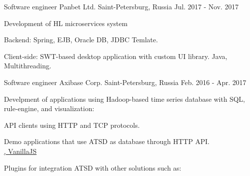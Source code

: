 

\begin{cventries}

  \cventry
  {Software engineer} %
  {Panbet Ltd.} %
  {Saint-Petersburg, Russia} %
  {Jul. 2017 - Nov. 2017} %
  {
  \begin{cvitems}
    \item{Development of HL microservices system}
    \item{Backend: Spring, EJB, Oracle DB, JDBC Temlate.}
    \item{Client-side: SWT-based desktop application with custom UI library. Java, Multithreading.}
  \end{cvitems}
  }
  \cventry
  {Software engineer} %
  {Axibase Corp.} %
  {Saint-Petersburg, Russia} %
  {Feb. 2016 - Apr. 2017} %
  {
  \begin{cvitems} %
    \item {Develpment of applications using Hadoop-based time series database with SQL, rule-engine, and visualization:}
    \item {API clients using HTTP and TCP protocols.
    \\ \href{https://github.com/axibase/atsd-api-java}{\faGithubSquare\acvHeaderIconSep\@Java}
    \href{https://github.com/axibase/atsd-api-nodejs}{\faGithubSquare\acvHeaderIconSep\@NodeJS}
    }
    \item{ Demo applications that use ATSD as database through HTTP API.
    \\ \href{https://github.com/axibase/nodejs-dataslider}{\faGithubSquare\acvHeaderIconSep\@NodeJS, VanillaJS}
    }
    \item {Plugins for integration ATSD with other solutions such as:
    \\ \href{https://github.com/axibase/grafana-data-source}{\faGithubSquare\acvHeaderIconSep\@Graphana}
}
\end{cvitems}}
\end{cventries}

